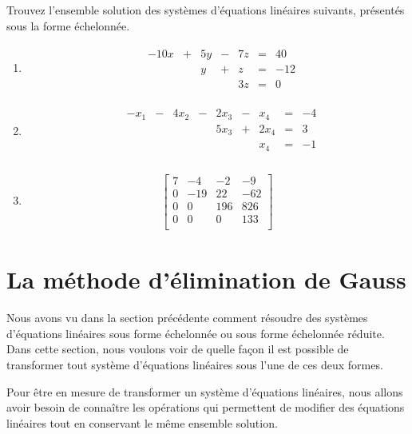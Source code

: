 \documentclass[]{book}
\providecommand{\tightlist}{%
  \setlength{\itemsep}{0pt}\setlength{\parskip}{0pt}}
\theoremstyle{definition}
\theoremstyle{definition}
\theoremstyle{definition}
\theoremstyle{remark}
\let\BeginKnitrBlock\begin \let\EndKnitrBlock\end
\begin{document}
\BeginKnitrBlock{example}
\protect\hypertarget{exm:unnamed-chunk-18}{}{\label{exm:unnamed-chunk-18} }Trouvez l'ensemble solution des systèmes d'équations linéaires suivants, présentés sous la forme échelonnée.

\begin{enumerate}
\def\labelenumi{\alph{enumi}.}
\tightlist
\item
  \begin{align*}
  \begin{array}{cccccccc}
  &-10x&+&5y&-&7z&=&40 \\
  &&&y&+&z&=&-12 \\
  &&&&&3z&=&0
  \end{array}
  \end{align*}
\item
  \begin{align*}
  \begin{array}{cccccccccc}
  &-x_{1}&-&4x_{2}&-&2x_{3}&-&x_{4}&=&-4\\
  &&&&&5x_{3}&+&2x_{4}&=&3\\
  &&&&&&&x_{4}&=&-1\\
  \end{array}
  \end{align*}
\item
  \begin{align*}
  \left[\begin{array}{ccc|c}
  7&-4&-2&-9\\
  0&-19&22&-62\\
  0&0&196&826\\
  0&0&0&133\\
  \end{array}\right]
  \end{align*}
\end{enumerate}
\EndKnitrBlock{example}

\hypertarget{methode-gauss}{%
\section{La méthode d'élimination de Gauss}\label{methode-gauss}}

Nous avons vu dans la section précédente comment résoudre des systèmes d'équations linéaires sous forme échelonnée ou sous forme échelonnée réduite. Dans cette section, nous voulons voir de quelle façon il est possible de transformer tout système d'équations linéaires sous l'une de ces deux formes.

Pour être en mesure de transformer un système d'équations linéaires, nous allons avoir besoin de connaître les opérations qui permettent de modifier des équations linéaires tout en conservant le même ensemble solution.
\end{document}
